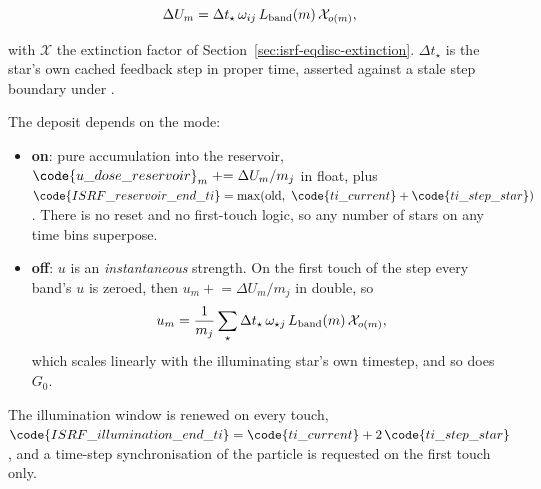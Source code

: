 \begin{equation}
  \Delta U_m = \Delta t_\star\, \omega_{ij}\, L_{\rm band}(m)\,
    \mathcal{X}_{o(m)},
  \label{eq:isrfd-inj-energy}
\end{equation}

with $\mathcal{X}$ the extinction factor of
Section~\ref{sec:isrf-eqdisc-extinction}. $\Delta t_\star$ is the star's own
cached feedback step in proper time, asserted against a stale step boundary under
.

The deposit depends on the mode:

\begin{itemize}
  \item {} \textbf{on}: pure accumulation into the reservoir,
    $\code{u\_dose\_reservoir}_m \mathrel{+}= \Delta U_m / m_j$ in float, plus
    $\code{ISRF\_reservoir\_end\_ti} = \max(\text{old},\
    \code{ti\_current} + \code{ti\_step\_star})$. There is no reset and no
    first-touch logic, so any number of stars on any time bins superpose.
  \item \code{ISRF\_propagation} \textbf{off}: $u$ is an \emph{instantaneous}
    strength. On the first touch of the step every band's $u$ is zeroed,
    then
    $u_m \mathrel{+}= \Delta U_m/m_j$ in double, so
    \begin{equation}
      u_m = \frac{1}{m_j}\sum_{\star} \Delta t_\star\, \omega_{\star j}\,
        L_{\rm band}(m)\, \mathcal{X}_{o(m)},
      \label{eq:isrfd-inj-instantaneous}
    \end{equation}
    which scales linearly with the
    illuminating star's own timestep, and so does $G_0$.
\end{itemize}

The illumination window is renewed on every touch,
$\code{ISRF\_illumination\_end\_ti} = \code{ti\_current} + 2\,\code{ti\_step\_star}$,
and a time-step synchronisation of the particle is requested on the first
touch only.

